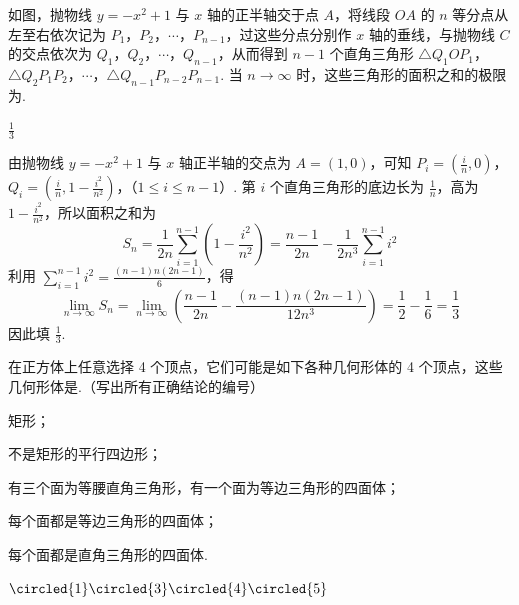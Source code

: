 \begin{problem}
如图，抛物线 \( y = -x^{2} + 1 \) 与 \( x \) 轴的正半轴交于点 \(A\)，将线段 \(OA\) 的 \( n \) 等分点从左至右依次记为 \(P_{1}\)，\(P_{2}\)，\(\cdots\)，\(P_{n-1}\)，过这些分点分别作 \( x \) 轴的垂线，与抛物线 \(C\) 的交点依次为 \(Q_{1}\)，\(Q_{2}\)，\(\cdots\)，\(Q_{n-1}\)，从而得到 \( n - 1 \) 个直角三角形 \(\triangle Q_{1}OP_{1}\)，\(\triangle Q_{2}P_{1}P_{2}\)，\(\cdots\)，\(\triangle Q_{n-1}P_{n-2}P_{n-1}\). 当 \( n \to \infty \) 时，这些三角形的面积之和的极限为\fillinblank{}.

\end{problem}

\begin{answer}
\(\frac{1}{3}\)
\end{answer}

\begin{solution}
由抛物线 \(y=-x^2+1\) 与 \(x\) 轴正半轴的交点为 \(A=(1,0)\)，可知
\(P_i=\left(\frac{i}{n},0\right)\)，\(Q_i=\left(\frac{i}{n},1-\frac{i^2}{n^2}\right)\)，（\(1\leqslant i\leqslant n-1\)）.
第 \(i\) 个直角三角形的底边长为 \(\frac1n\)，高为 \(1-\frac{i^2}{n^2}\)，所以面积之和为
\[
S_n=\frac{1}{2n}\sum_{i=1}^{n-1}\left(1-\frac{i^2}{n^2}\right)
=\frac{n-1}{2n}-\frac{1}{2n^3}\sum_{i=1}^{n-1}i^2
\]
利用 \(\sum_{i=1}^{n-1}i^2=\frac{(n-1)n(2n-1)}{6}\)，得
\[
\lim_{n\to\infty}S_n
=\lim_{n\to\infty}\left(\frac{n-1}{2n}
-\frac{(n-1)n(2n-1)}{12n^3}\right)
=\frac12-\frac16=\frac13
\]
因此填 \(\frac13\).
\end{solution}

\begin{problem}
在正方体上任意选择 4 个顶点，它们可能是如下各种几何形体的 4 个顶点，这些几何形体是\fillinblank{}.（写出所有正确结论的编号）

\begin{circlelist}
\item 矩形；
\item 不是矩形的平行四边形；
\item 有三个面为等腰直角三角形，有一个面为等边三角形的四面体；
\item 每个面都是等边三角形的四面体；
\item 每个面都是直角三角形的四面体.
\end{circlelist}
\end{problem}

\begin{answer}
\(\circled{1}\circled{3}\circled{4}\circled{5}\)
\end{answer}

